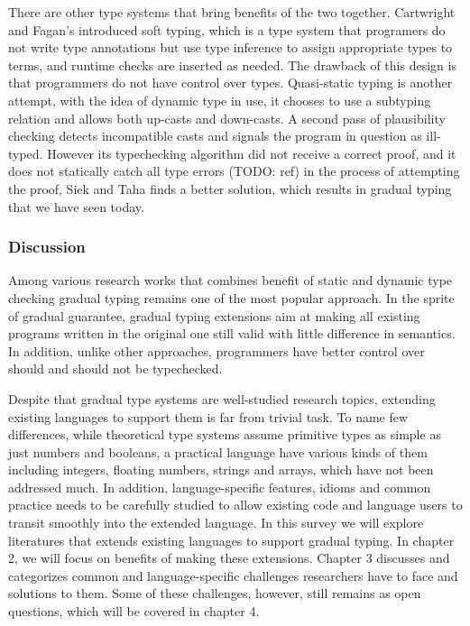 There are other type systems that bring benefits of the two together.
Cartwright and Fagan's introduced soft typing, which is a type system
that programers do not write type annotations but use type inference to
assign appropriate types to terms, and runtime checks are inserted as needed.
The drawback of this design is that programmers do not have control over types.
Quasi-static typing is another attempt, with the idea of dynamic type in use,
it chooses to use a subtyping relation and allows both up-casts and down-casts.
A second pass of plausibility checking detects incompatible casts and signals the program
in question as ill-typed. However its typechecking algorithm did not receive a correct proof,
and it does not statically catch all type errors (TODO: ref)
in the process of attempting the proof, Siek and Taha finds a better solution, 
which results in gradual typing that we have seen today.

\subsubsection{Discussion}

Among various research works that combines
benefit of static and dynamic type checking
gradual typing remains one of the most popular approach.
In the sprite of gradual guarantee, gradual typing extensions aim at
making all existing programs written in the original one still valid with little difference in semantics.
In addition, unlike other approaches, programmers have better control over should and should not be typechecked.

Despite that gradual type systems are well-studied research topics,
extending existing languages to support them is far from trivial task.
To name few differences, while theoretical type systems assume primitive types as simple as just numbers and booleans,
a practical language have various kinds of them including integers, floating numbers, strings and arrays,
which have not been addressed much.
In addition, language-specific features, idioms and common practice needs
to be carefully studied to allow existing code and language users to transit smoothly into
the extended language. In this survey we will explore literatures that extends existing languages to support gradual typing.
In chapter 2, we will focus on benefits of making these extensions. Chapter 3 discusses and categorizes common and language-specific
challenges researchers have to face and solutions to them.
Some of these challenges, however, still remains as open questions, which will be covered in chapter 4.

